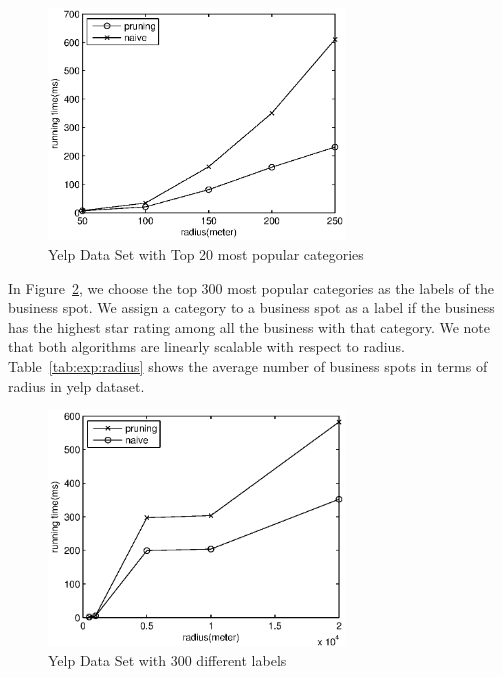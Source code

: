 \begin{figure}[h]
    \centering
      \includegraphics[width=0.7\textwidth]{figs/YelpTop20Labels}
    \caption{Yelp Data Set with Top 20 most popular categories}
    \label{fig:exp:yelp20l}
\end{figure}

In Figure~\ref{fig:exp:yelp300l}, we choose the top $300$ most popular categories as the labels of the business spot. We assign a category to a business spot as a label if the business has the highest star rating among all the business with that category. We note that both algorithms are linearly scalable with respect to radius. Table~\ref{tab:exp:radius} shows the average number of business spots in terms of radius in yelp dataset.

\begin{figure}[h]
    \centering
      \includegraphics[width=0.7\textwidth]{figs/Yelp300Labels}
    \caption{Yelp Data Set with 300 different labels}
    \label{fig:exp:yelp300l}
\end{figure}


